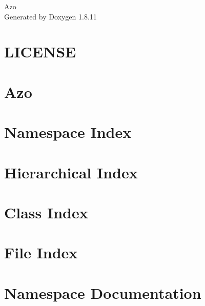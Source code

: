 \documentclass[twoside]{book}
\newcommand{\+}{\discretionary{\mbox{\scriptsize$\hookleftarrow$}}{}{}}
\newcommand{\clearemptydoublepage}{%
  \newpage{\pagestyle{empty}\cleardoublepage}%
}
\begin{document}
\hypersetup{pageanchor=false,
             bookmarksnumbered=true,
             pdfencoding=unicode
            }
\begin{titlepage}
\vspace*{7cm}
\begin{center}%
{\Large Azo }\\
\vspace*{1cm}
{\large Generated by Doxygen 1.8.11}\\
\end{center}
\end{titlepage}
\clearemptydoublepage
\tableofcontents
\clearemptydoublepage
{}
\hypersetup{pageanchor=true}

\chapter{L\+I\+C\+E\+N\+SE}
\label{md_LICENSE}
\hypertarget{md_LICENSE}{}

\chapter{Azo}
\label{md_README}
\hypertarget{md_README}{}

\chapter{Namespace Index}

\chapter{Hierarchical Index}

\chapter{Class Index}

\chapter{File Index}

\chapter{Namespace Documentation}



\end{document}
